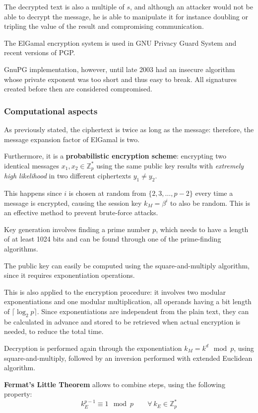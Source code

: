 The decrypted text is also a multiple of $s$, and although an attacker would not be able to decrypt the message, he is able to manipulate it for instance doubling or tripling the value of the result and compromising communication.

The ElGamal encryption system is used in GNU Privacy Guard System and recent versions of PGP. 

GnuPG implementation, however, until late 2003 had an insecure algorithm whose private exponent was too short and thus easy to break. All signatures created before then are considered compromised. 

\subsubsection{Computational aspects}
As previously stated, the ciphertext is twice as long as the message: therefore, the message expansion factor of ElGamal is two. 

Furthermore, it is a \textbf{probabilistic encryption scheme}: encrypting two identical messages $x_1, x_2 \in \mathbb{Z}^*_p$ using the same public key results with \textit{extremely high likelihood} in two different ciphertexts $y_1 \neq y_2$. 

This happens since $i$ is chosen at random from $\{2, 3, \dots, p - 2\}$ every time a message is encrypted, causing the session key $k_M = \beta^i$ to also be random. This is an effective method to prevent brute-force attacks.

Key generation involves finding a prime number $p$, which needs to have a length of at least 1024 bits and can be found through one of the prime-finding algorithms. 

The public key can easily be computed using the square-and-multiply algorithm, since it requires exponentiation operations.

This is also applied to the encryption procedure: it involves two modular exponentiations and one modular multiplication, all operands having a bit length of $\lceil\log_2p\rceil$. Since exponentiations are independent from the plain text, they can be calculated in advance and stored to be retrieved when actual encryption is needed, to reduce the total time.

Decryption is performed again through the exponentiation $k_M = k^d \mod p$, using square-and-multiply, followed by an inversion performed with extended Euclidean algorithm.

\textbf{Fermat's Little Theorem }allows to combine steps, using the following property:
$$k_E^{p-1} \equiv 1 \mod p \qquad \forall\ k_E \in \mathbb{Z}^*_p$$

